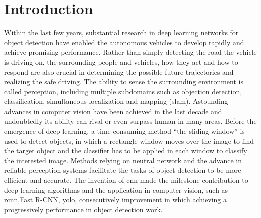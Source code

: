 
\chapter{Introduction}
\label{sec:introduction}
Within the last few years, substantial research in deep learning networks for object detection have enabled the autonomous vehicles to develop rapidly and achieve promising performance. Rather than simply detecting the road the vehicle is driving on, the surrounding people and vehicles, how they act and how to respond are also crucial in determining the possible future trajectories and realizing the safe driving. The ability to sense the surrounding environment is called perception, including multiple subdomains such as objection detection\cite{girshick_rich_2014}, classification\cite{krizhevsky_imagenet_2017}, simultaneous localization and mapping (\acrshort{slam})\cite{smith_estimating_2013,montemerlo_fastslam_nodate}. Astounding advances in computer vision have been achieved in the last decade and undoubtedly its ability can rival or even surpass human in many areas. Before the emergence of deep learning, a time-consuming method “the sliding window”\cite{enzweiler_monocular_2009} is used to detect objects, in which a rectangle window moves over the image to find the target object and the classifier has to be applied in each window to classify the interested image. Methods relying on neutral network and the advance in reliable perception systems facilitate the tasks of object detection to be more efficient and accurate. The invention of \acrshort{cnn}\cite{lecun_backpropagation_1989} made the milestone contribution to deep learning algorithms and the application in computer vision, such as \acrshort{rcnn}\cite{girshick_rich_2014},Fast R-CNN\cite{girshick_fast_2015}, \acrshort{yolo}\cite{redmon_you_2016}, consecutively improvement in which achieving a progressively performance in object detection work.

